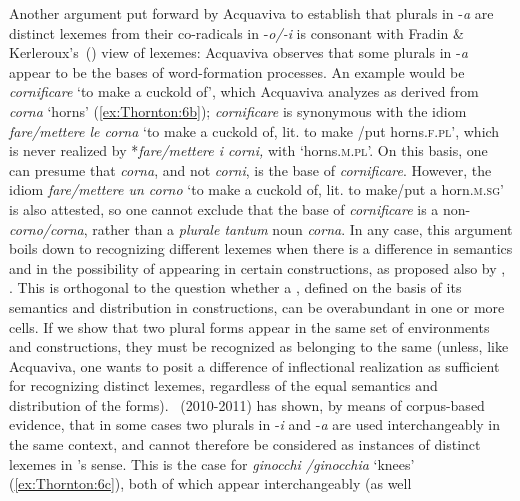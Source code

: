 \documentclass[output=paper]{langsci/langscibook}
\begin{document}
Another argument put forward by Acquaviva to establish that plurals in
-\emph{a} are distinct lexemes from their co-radicals in -\emph{o\slash{}-i} is
consonant with 
Fradin \& Kerle\-roux's~(\citeyear{Fradin03b}) view of lexemes: Acquaviva
observes that some plurals in -\emph{a} appear to be the bases of
word-formation processes. An example would be \emph{cornificare} `to
make a cuckold of', which Acquaviva analyzes as derived from
\emph{corna} `horns' (\ref{ex:Thornton:6b}); \emph{cornificare} is synonymous with the
idiom \emph{fare\slash{}mettere le corna} `to make a cuckold of, lit. to make
\slash{}put horns.\textsc{f.pl}', which is never realized by
*\emph{fare\slash{}mettere i corni,} with `horns.\textsc{m.pl}'. On this basis,
one can presume that \emph{corna}, and not \emph{corni}, is the base of
\emph{cornificare}. However, the idiom \emph{fare\slash{}mettere un corno}
`to make a cuckold of, lit. to make\slash{}put a horn.\textsc{m.sg}' is also
attested, so one cannot exclude that the base of \emph{cornificare} is a
non-  \emph{corno\slash{}corna}, rather than a \emph{plurale
tantum}  noun \emph{corna}. In any case, this argument boils
down to recognizing different lexemes when there is a difference in
semantics and in the possibility of appearing in certain constructions,
as proposed also by %
\citet{Fradin03b,Fradin09}%
%
, %
\citet{Fradin2003}%
%
.
This is orthogonal to the question whether a , defined on the
basis of its semantics and distribution in constructions, can be
overabundant in one or more cells. If we show that two plural forms
appear in the same set of environments and constructions, they must be
recognized as belonging to the same  (unless, like Acquaviva, one
wants to posit a difference of inflectional realization as sufficient
for recognizing distinct lexemes, regardless of the equal semantics and
distribution of the forms). %
\citeauthor{Thornton2011b}~(2010-2011) 
has shown, by
means of corpus-based evidence, that in some cases two plurals in
-\emph{i} and -\emph{a} are used interchangeably in the same context,
and cannot therefore be considered as instances of distinct lexemes in
%
\citet{Fradin03b}%
%
's sense. This is the case for \emph{ginocchi
\slash{}ginocchia} `knees' (\ref{ex:Thornton:6c}), both of which appear interchangeably (as well
\end{document}
